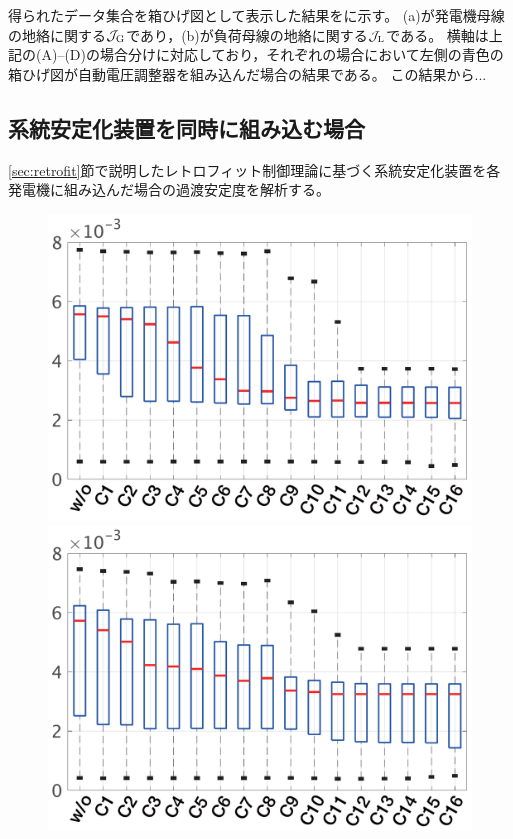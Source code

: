 \documentclass[tombow,dvipdfmx]{corona-a5-1.1}
\begin{document}
得られたデータ集合を箱ひげ図として表示した結果を\FIGref{}に示す。
\FIGref{}(a)が発電機母線の地絡に関する$\mathcal{J}_{\rm G}$であり，\FIGref{}(b)が負荷母線の地絡に関する$\mathcal{J}_{\rm L}$である。
横軸は上記の(A)--(D)の場合分けに対応しており，それぞれの場合において左側の青色の箱ひげ図が自動電圧調整器を組み込んだ場合の結果である。
この結果から...

\subsection{系統安定化装置を同時に組み込む場合}

\ref{sec:retrofit}節で説明したレトロフィット制御理論に基づく系統安定化装置を各発電機に組み込んだ場合の過渡安定度を解析する。



\begin{figure}[t]
  \centering
  {
  \begin{minipage}{0.49\linewidth}
    \centering
    \includegraphics[width = 1.0\linewidth]{figs/boxplotgen}
  \end{minipage}
  \begin{minipage}{0.49\linewidth}
    \centering
    \includegraphics[width = 1.0\linewidth]{figs/boxplotload}

\end{minipage}}
\end{figure}
\end{document}
